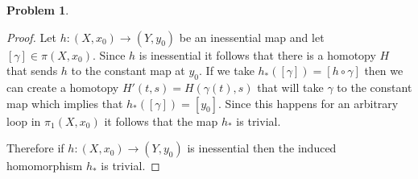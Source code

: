 \documentclass[10pt]{article}
\newcommand{\sk}{\vskip 10mm}
\theoremstyle{plain}
\newtheorem{problem}{Problem}
\theoremstyle{remark}
\begin{document}
\sk

\begin{problem} %
  
\end{problem}

\begin{proof}
  Let $h:(X,x_0)\rightarrow (Y,y_0)$ be an inessential map and let $[\gamma]\in \pi(X,x_0)$.
  Since $h$ is inessential it follows that there is a homotopy $H$ that
  sends $h$ to the constant map at $y_0$. If we take $h_*([\gamma])=[h\circ\gamma]$
  then we can create a homotopy $H'(t,s)=H(\gamma(t),s)$ that will take $\gamma$
  to the constant map which implies that $h_*([\gamma])=[y_0]$. Since
  this happens for an arbitrary loop in $\pi_1(X,x_0)$ it follows that
  the map $h_*$ is trivial.

  Therefore if $h:(X,x_0)\rightarrow (Y,y_0)$ is inessential then the induced homomorphism
  $h_*$ is trivial.
\end{proof}
  
\end{document}
